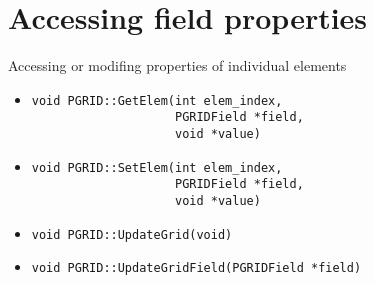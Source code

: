 \documentclass[12pt]{article}
\begin{document}
\section{Accessing field properties}
Accessing or modifing properties of individual elements
\begin{itemize}
\item \begin{verbatim}
void PGRID::GetElem(int elem_index,
                    PGRIDField *field,
                    void *value)
\end{verbatim}
\item \begin{verbatim}
void PGRID::SetElem(int elem_index,
                    PGRIDField *field,
                    void *value)
\end{verbatim}
\item \begin{verbatim}
void PGRID::UpdateGrid(void)
\end{verbatim}
\item \begin{verbatim}
void PGRID::UpdateGridField(PGRIDField *field)
\end{verbatim}
\end{itemize}
\end{document}
